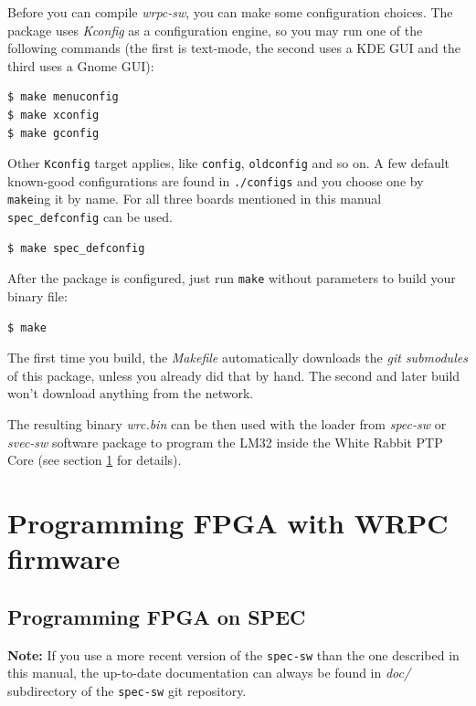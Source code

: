 \documentclass[a4paper, 12pt]{article}
\newcommand{\code}[1]{\texttt{#1}}
\begin{document}
Before you can compile \textit{wrpc-sw}, you can make some configuration
choices. The package uses \textit{Kconfig} as a configuration engine, so you may
run one of the following commands (the first is text-mode, the second uses a KDE
GUI and the third uses a Gnome GUI):
\begin{lstlisting}
$ make menuconfig
$ make xconfig
$ make gconfig
\end{lstlisting}

Other \code{Kconfig} target applies, like \code{config}, \code{oldconfig}
and so on. A few default known-good configurations are found in
\texttt{./configs} and you choose one by \code{make}ing it by name. For all
three boards mentioned in this manual \code{spec\_defconfig} can be used.
\begin{lstlisting}
$ make spec_defconfig
\end{lstlisting}

After the package is configured, just run \code{make} without parameters to
build your binary file:
\begin{lstlisting}
$ make
\end{lstlisting}

The first time you build, the \textit{Makefile} automatically downloads
the \textit{git submodules} of this package, unless you already did that
by hand. The second and later build won't download anything
from the network.

The resulting binary \textit{wrc.bin} can be then used with the loader from
\textit{spec-sw} or \textit{svec-sw} software package to program the LM32 inside
the White Rabbit PTP Core (see section \ref{Programming FPGA} for details).

\section{Programming FPGA with WRPC firmware}
\label{Programming FPGA}

\subsection{Programming FPGA on SPEC}
\label{Programming FPGA on SPEC}

\textbf{Note:} If you use a more recent version of the \texttt{spec-sw} than the
one described in this manual, the up-to-date documentation can always be found
in \textit{doc/} subdirectory of the \texttt{spec-sw} git repository.\\
\end{document}
